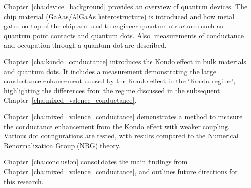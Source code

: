 Chapter~\ref{cha:device_background} provides an overview of quantum devices. The chip material (GaAas/AlGaAs heterostructure) is introduced and how metal gates on top of the chip are used to engineer quantum structures such as quantum point contacts and quantum dots. Also, measurements of conductance and occupation through a quantum dot are described.


Chapter~\ref{cha:kondo_conductance} introduces the Kondo effect in bulk materials and quantum dots. It includes a measurement demonstrating the large conductance enhancement caused by the Kondo effect in the `Kondo regime', highlighting the differences from the regime discussed in the subsequent Chapter~\ref{cha:mixed_valence_conductance}.



Chapter~\ref{cha:mixed_valence_conductance} demonstrates a method to measure the conductance enhancement from the Kondo effect with weaker coupling. Various dot configurations are tested, with results compared to the Numerical Renormalization Group (NRG) theory.



Chapter~\ref{cha:conclusion} consolidates the main findings from Chapter~\ref{cha:mixed_valence_conductance}, and outlines future directions for this research.